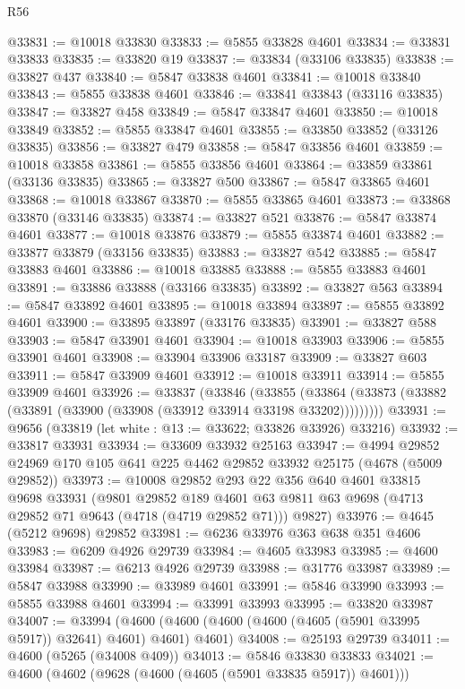 \begin{lexlean}{R56}
\begin{coremodule}
@33831 := @10018 @33830
@33833 := @5855 @33828 @4601
@33834 := @33831 @33833
@33835 := @33820 @19
@33837 := @33834 (@33106 @33835)
@33838 := @33827 @437
@33840 := @5847 @33838 @4601
@33841 := @10018 @33840
@33843 := @5855 @33838 @4601
@33846 := @33841 @33843 (@33116 @33835)
@33847 := @33827 @458
@33849 := @5847 @33847 @4601
@33850 := @10018 @33849
@33852 := @5855 @33847 @4601
@33855 := @33850 @33852 (@33126 @33835)
@33856 := @33827 @479
@33858 := @5847 @33856 @4601
@33859 := @10018 @33858
@33861 := @5855 @33856 @4601
@33864 := @33859 @33861 (@33136 @33835)
@33865 := @33827 @500
@33867 := @5847 @33865 @4601
@33868 := @10018 @33867
@33870 := @5855 @33865 @4601
@33873 := @33868 @33870 (@33146 @33835)
@33874 := @33827 @521
@33876 := @5847 @33874 @4601
@33877 := @10018 @33876
@33879 := @5855 @33874 @4601
@33882 := @33877 @33879 (@33156 @33835)
@33883 := @33827 @542
@33885 := @5847 @33883 @4601
@33886 := @10018 @33885
@33888 := @5855 @33883 @4601
@33891 := @33886 @33888 (@33166 @33835)
@33892 := @33827 @563
@33894 := @5847 @33892 @4601
@33895 := @10018 @33894
@33897 := @5855 @33892 @4601
@33900 := @33895 @33897 (@33176 @33835)
@33901 := @33827 @588
@33903 := @5847 @33901 @4601
@33904 := @10018 @33903
@33906 := @5855 @33901 @4601
@33908 := @33904 @33906 @33187
@33909 := @33827 @603
@33911 := @5847 @33909 @4601
@33912 := @10018 @33911
@33914 := @5855 @33909 @4601
@33926 := @33837
    (@33846
      (@33855 (@33864 (@33873 (@33882 (@33891 (@33900 (@33908 (@33912 @33914 @33198 @33202)))))))))
@33931 := @9656 (@33819 (let white : @13 := @33622; @33826 @33926) @33216)
@33932 := @33817 @33931
@33934 := @33609 @33932 @25163
@33947 := @4994 @29852 @24969 @170 @105 @641 @225 @4462 @29852 @33932 @25175 (@4678 (@5009 @29852))
@33973 := @10008
    @29852
    @293
    @22
    @356
    @640
    @4601
    @33815
    @9698
    @33931
    (@9801
      @29852
      @189
      @4601
      @63
      @9811
      @63
      @9698
      (@4713 @29852 @71 @9643 (@4718 (@4719 @29852 @71)))
      @9827)
@33976 := @4645 (@5212 @9698) @29852
@33981 := @6236 @33976 @363 @638 @351 @4606
@33983 := @6209 @4926 @29739
@33984 := @4605 @33983
@33985 := @4600 @33984
@33987 := @6213 @4926 @29739
@33988 := @31776 @33987
@33989 := @5847 @33988
@33990 := @33989 @4601
@33991 := @5846 @33990
@33993 := @5855 @33988 @4601
@33994 := @33991 @33993
@33995 := @33820 @33987
@34007 := @33994
    (@4600 (@4600 (@4600 (@4600 (@4605 (@5901 @33995 @5917)) @32641) @4601) @4601) @4601)
@34008 := @25193 @29739
@34011 := @4600 (@5265 (@34008 @409))
@34013 := @5846 @33830 @33833
@34021 := @4600 (@4602 (@9628 (@4600 (@4605 (@5901 @33835 @5917)) @4601)))

\end{coremodule}
\end{lexlean}
